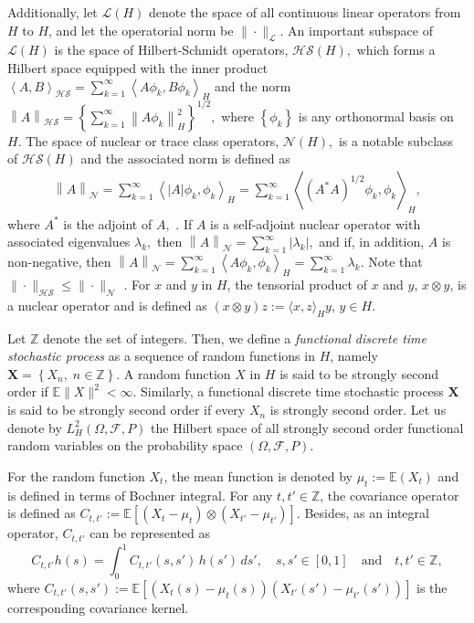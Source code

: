 \documentclass[11pt,a4paper]{article}
\numberwithin{equation}{section}
\newcommand{\E}{\mathbb{E}}
\begin{document}
Additionally, let $\mathcal{L}(H)$ denote the space of all continuous linear operators from $H$ to $H$, and let the operatorial norm be $\|\cdot\|_\mathcal{L}$. An important subspace of $\mathcal{L}(H)$ is the space of Hilbert-Schmidt operators, $\mathcal{HS}(H),$ which forms a Hilbert space
equipped  with the inner product $\left\langle
A,B\right\rangle_{\mathcal{HS}}=\sum_{k=1}^\infty\left\langle
A\phi_k, B\phi_k\right\rangle_H$  and  the norm
$\left\|A\right\|_{\mathcal{HS}}=\left\{\sum_{k=1}^\infty\left\|A\phi_k\right\|_H^2\right\}^{1/2},$
where
 $\left\{\phi_k\right\}$ is any orthonormal basis
 on $H.$ The space of nuclear or trace class operators, ${\mathcal{N}}\left(H\right),$ is  a notable subclass of $\mathcal{HS}\left(H\right)$ and
 the associated norm  is   defined as
\begin{eqnarray}\label{eq-nuclear}\left\|A\right\|_{\mathcal{N}}=\sum_{k=1}^\infty \left\langle
\left|A\right|\phi_k,\phi_k\right\rangle_H=\sum_{k=1}^\infty
\left\langle
\left(A^*A\right)^{1/2}\phi_k,\phi_k\right\rangle_H,\end{eqnarray}
where $A^*$ is the adjoint of $A,$ \citet{conway2000course}. If $A$ is a
self-adjoint nuclear operator with associated  eigenvalues
$\lambda_k,$ then
$\left\|A\right\|_{\mathcal{N}}=\sum_{k=1}^\infty\left|\lambda_k\right|,$
and if, in addition, $A$ is non-negative, then
$\left\|A\right\|_{\mathcal{N}}=\sum_{k=1}^\infty \left\langle
A\phi_k,\phi_k\right\rangle_H=\sum_{k=1}^\infty\lambda_k.$
 Note that $\|\cdot\|_{\mathcal{HS}}\leq \|\cdot\|_{\mathcal{N}}$ \citep{hsing2015theoretical}. For $x$ and $y$ in $H$, the tensorial product of $x$ and $y$, $x\otimes y$, is a nuclear operator and is defined as $(x\otimes y)z:= \langle x,z \rangle_H y$, $y\in H$.

Let ${\mathbb{Z}}$ denote the set of integers. Then, we define a \emph{functional discrete time stochastic process} as a sequence of random functions in $H$, namely $\bm{X}=\left\{X_n,\;n\in {\mathbb{Z}}\right\}$. A random function $X$ in $H$ is said to be strongly second order if $\E\|X\|^2<\infty$. Similarly, a functional discrete time stochastic process $\bm{X}$ is said to be strongly second order if every $X_n$ is strongly second order. Let us denote by $L^2_H(\Omega,\mathcal{F},P)$ the Hilbert space of all strongly second order functional random variables on the probability space $(\Omega,\mathcal{F},P)$.

For the random function $X_t$, the mean function is denoted by $\mu_t:= \E(X_t)$ and is defined in terms of Bochner integral. For any $t,t'\in {\mathbb{Z}}$, the covariance operator is defined as $C_{t,t'} := \E\left[( X_t-\mu_t)\otimes (X_{t'}-\mu_{t'})\right]$. Besides, as an integral operator, $C_{t,t'}$ can be represented as
\[
  C_{t,t'}h(s)=\int_0^1 C_{t,t'} (s,s')\,h (s')\,ds',
  \quad s,s'\in [0,1] \quad{\text{and}}\quad t,t'\in {\mathbb{Z}},
\]
where $C_{t,t'}\left(s,s'\right) := \E\left[(X_t(s)-\mu_t(s)) (X_{t'}(s')-\mu_{t'}(s'))\right]$ is the corresponding covariance kernel.
\end{document}
